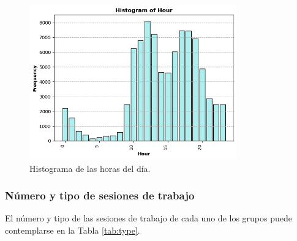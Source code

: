 \begin{figure}[H]
    \centering
    \includegraphics[width=0.80\textwidth]{imagenes/histogramhour.png}
    \caption{Histograma de las horas del día.}
    \label{fig:hours}
\end{figure}

\subsubsection{Número y tipo de sesiones de trabajo}

El número y tipo de las sesiones de trabajo de cada uno de los grupos puede contemplarse en la Tabla \ref{tab:type}.

